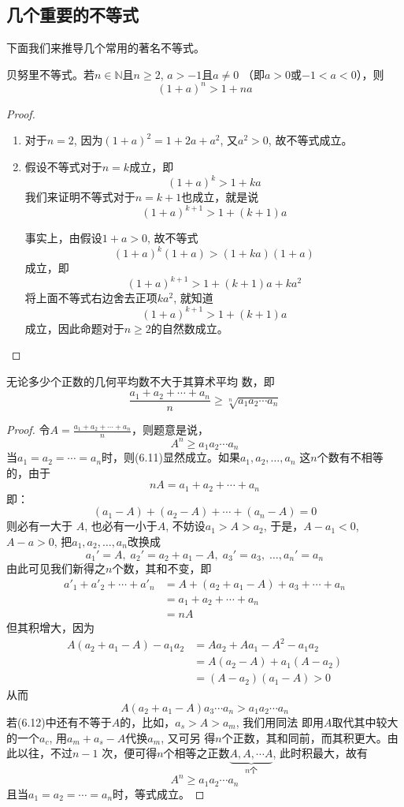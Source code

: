 \subsection{几个重要的不等式}
下面我们来推导几个常用的著名不等式。


\begin{example}
    贝努里不等式。若$n\in\mathbb{N}$且$n\ge 2$, $a>-1$且$a\ne 0$
（即$a>0$或$-1<a<0$），则
\[(1+a)^n>1+na\]
\end{example}


\begin{proof}
\begin{enumerate}
    \item 对于$n=2$, 因为$(1+a)^2=1+2a+a^2$, 又$a^2>0$, 故不等式成立。
\item 假设不等式对于$n=k$成立，即
\[(1+a)^k>1+ka\]
我们来证明不等式对于$n=k+1$也成立，就是说
\[(1+a)^{k+1}>1+(k+1)a\]

事实上，由假设$1+a>0$, 故不等式
\[(1+a)^k(1+a)>(1+ka)(1+a)\]
成立，即
\[(1+a)^{k+1}>1+(k+1)a+ka^2\]
将上面不等式右边舍去正项$ka^2$, 就知道
\[(1+a)^{k+1}>1+(k+1)a\]
成立，因此命题对于$n\ge 2$的自然数成立。
\end{enumerate}
\end{proof}

\begin{example}
    无论多少个正数的几何平均数不大于其算术平均
数，即
\[\frac{a_1+a_2+\cdots+a_n}{n}\ge \sqrt[n]{a_1a_2\cdots a_n}\]
\end{example}

\begin{proof}
令$A=\frac{a_1+a_2+\cdots+a_n}{n}$，则题意是说，
\begin{equation}
    A^n\ge a_1a_2\cdots a_n
\end{equation}
当$a_1=a_2=\cdots= a_n$时，则(6.11)显然成立。如果$a_1,a_2,\ldots,a_n$
这$n$个数有不相等的，由于
    \[nA=a_1+a_2+\cdots+a_n\]
即：
\[(a_1-A)+(a_2-A)+\cdots+(a_n-A)=0\]
则必有一大于
$A$, 也必有一小于$A$, 不妨设$a_1>A>a_2$, 于是，$A-a_1<0$,
$A-a>0$, 把$a_1,a_2,\ldots,a_n$改换成
\begin{equation}
a_1'=A,\; a_2'=a_2+a_1-A,\; a_3'=a_3,\; \ldots, a_n'=a_n
\end{equation}
由此可见我们新得之$n$个数，其和不变，即
\[\begin{split}
    a'_1+a'_2+\cdots +a'_n&=A+(a_2+a_1-A)+a_3+\cdots +a_n\\
&= a_1+a_2+\cdots +a_n\\
&=nA
\end{split}\]
但其积增大，因为
\[\begin{split}
    A(a_2+a_1-A)-a_1a_2&=Aa_2+Aa_1-A^2-a_1a_2\\
&=A(a_2-A)+a_1(A-a_2)\\
&=(A-a_2)(a_1-A)>0
\end{split}\]
从而
\[A(a_2+a_1-A)a_3\cdots a_n>a_1a_2\cdots a_n\]
若(6.12)中还有不等于$A$的，比如，$a_s>A>a_m$, 我们用同法
即用$A$取代其中较大的一个$a_c$, 用$a_m+a_s-A$代换$a_m$, 又可另
得$n$个正数，其和同前，而其积更大。由此以往，不过$n-1$
次，便可得$n$个相等之正数$\underbrace{A,A,\cdots A}_{\text{$n$个}}$, 此时积最大，故有
\[A^n\ge a_1a_2\cdots a_n\]
且当$a_1=a_2=\cdots =a_n$时，等式成立。
\end{proof}

